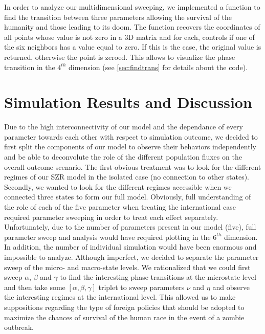 \documentclass[11pt]{article} %
\begin{document}
In order to analyze our multidimensional sweeping, we implemented a function to find the transition between three parameters allowing the survival of the humanity and those leading to its doom. The function recovers the coordinates of all points whose value is not zero in a 3D matrix and for each, controls if one of the six neighbors has a value equal to zero. If this is the case, the original value is returned, otherwise the point is zeroed. This allows to visualize the phase transition in the $4^{th}$ dimension (see \ref{sec:findtrans} for details about the code).





\newpage
\section{Simulation Results and Discussion}\indent

Due to the high interconnectivity of our model and the dependance of every parameter towards each other with respect to simulation outcome, we decided to first split the components of our model to observe their behaviors independently and be able to deconvolute the role of the different population fluxes on the overall outcome scenario. The first obvious treatment was to look for the different regimes of our SZR model in the isolated case (no connection to other states). Secondly, we wanted to look for the different regimes accessible when we connected three states to form our full model. Obviously, full understanding of the role of each of the five parameter when treating the international case required parameter sweeping in order to treat each effect separately. Unfortunately, due to the number of parameters present in our model (five), full parameter sweep and analysis would have required plotting in the $6^{th}$ dimension. In addition, the number of individual simulation would have been enormous and impossible to analyze. Although imperfect, we decided to separate the parameter sweep of the micro- and macro-state levels. We rationalized that we could first sweep $\alpha$, $\beta$ and $\gamma$  to find the interesting phase transitions at the microstate level and then take some $[\alpha, \beta, \gamma]$ triplet to sweep parameters $\nu$ and $\eta$ and observe the interesting regimes at the international level. This allowed us to make suppositions regarding the type of foreign policies that should be adopted to maximize the chances of survival of the human race in the event of a zombie outbreak. 
\end{document}
